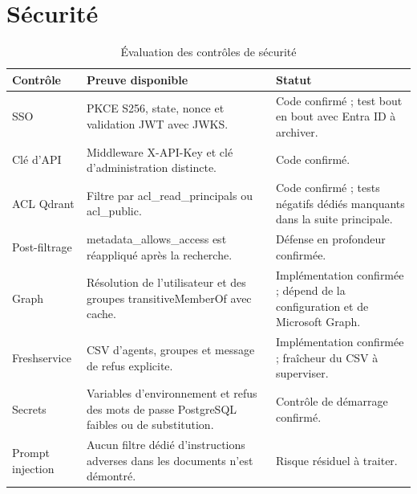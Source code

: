 \section{Sécurité}
\begin{table}[H]
\centering
\caption{Évaluation des contrôles de sécurité}
\label{tab:security_eval_ch7}
\begin{tabular}{p{3.0cm}p{6.0cm}p{4.5cm}}
\toprule
\textbf{Contrôle} & \textbf{Preuve disponible} & \textbf{Statut} \\
\midrule
SSO & PKCE S256, state, nonce et validation JWT avec JWKS. & Code confirmé ; test bout en bout avec Entra ID à archiver. \\
Clé d’API & Middleware X-API-Key et clé d’administration distincte. & Code confirmé. \\
ACL Qdrant & Filtre par acl\_read\_principals ou acl\_public. & Code confirmé ; tests négatifs dédiés manquants dans la suite principale. \\
Post-filtrage & metadata\_allows\_access est réappliqué après la recherche. & Défense en profondeur confirmée. \\
Graph & Résolution de l’utilisateur et des groupes transitiveMemberOf avec cache. & Implémentation confirmée ; dépend de la configuration et de Microsoft Graph. \\
Freshservice & CSV d’agents, groupes et message de refus explicite. & Implémentation confirmée ; fraîcheur du CSV à superviser. \\
Secrets & Variables d’environnement et refus des mots de passe PostgreSQL faibles ou de substitution. & Contrôle de démarrage confirmé. \\
Prompt injection & Aucun filtre dédié d’instructions adverses dans les documents n’est démontré. & Risque résiduel à traiter. \\
\bottomrule
\end{tabular}
\end{table}
